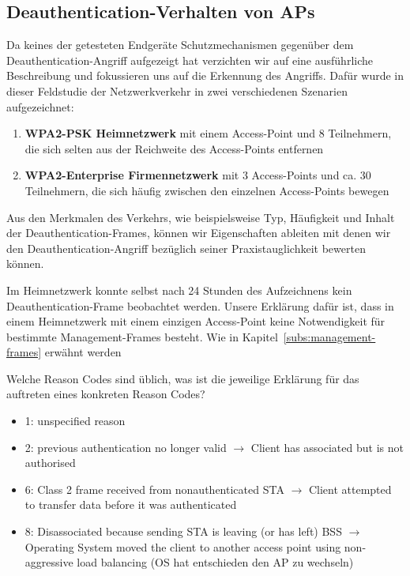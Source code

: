 

\subsection{Deauthentication-Verhalten von APs}
Da keines der getesteten Endgeräte Schutzmechanismen gegenüber dem Deauthentication-Angriff aufgezeigt hat verzichten wir auf eine ausführliche Beschreibung und fokussieren uns auf die Erkennung des Angriffs.
Dafür wurde in dieser Feldstudie der Netzwerkverkehr in zwei verschiedenen Szenarien aufgezeichnet:
\begin{enumerate}
	\item \textbf{WPA2-PSK Heimnetzwerk} mit einem Access-Point und 8 Teilnehmern, die sich selten aus der Reichweite des Access-Points entfernen
	\item \textbf{WPA2-Enterprise Firmennetzwerk} mit 3 Access-Points und ca. 30 Teilnehmern, die sich häufig zwischen den einzelnen Access-Points bewegen
\end{enumerate}
Aus den Merkmalen des Verkehrs, wie beispielsweise Typ, Häufigkeit und Inhalt der Deauthentication-Frames, können wir Eigenschaften ableiten mit denen wir den Deauthentication-Angriff bezüglich seiner Praxistauglichkeit bewerten können.

Im Heimnetzwerk konnte selbst nach 24 Stunden des Aufzeichnens kein Deauthentication-Frame beobachtet werden.
Unsere Erklärung dafür ist, dass in einem Heimnetzwerk mit einem einzigen Access-Point keine Notwendigkeit für bestimmte Management-Frames besteht.
Wie in Kapitel~\ref{subs:management-frames} erwähnt werden

Welche Reason Codes sind üblich, was ist die jeweilige Erklärung für das auftreten eines konkreten Reason Codes?
\begin{itemize}
	\item 1: unspecified reason 
	\item 2: previous authentication no longer valid $\rightarrow$ Client has associated but is not authorised
	\item 6: Class 2 frame received from nonauthenticated STA $\rightarrow$ Client attempted to transfer data before it was authenticated
	\item 8: Disassociated because sending STA is leaving (or has left) BSS $\rightarrow$ Operating System moved the client to another access point using non-aggressive load balancing (OS hat entschieden den AP zu wechseln)  
\end{itemize}

